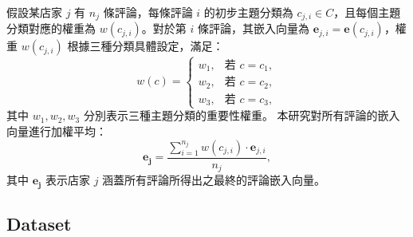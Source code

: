         假設某店家 \( j \) 有 \( n_j \) 條評論，每條評論 \( i \) 的初步主題分類為 \( c_{j,i} \in C \)，且每個主題分類對應的權重為 \( w(c_{j,i}) \)。對於第 \( i \) 條評論，其嵌入向量為 \( \mathbf{e}_{j,i} = \mathbf{e}(c_{j,i}) \)，權重 \( w(c_{j,i}) \) 根據三種分類具體設定，滿足：
        \begin{equation} 
            w(c) = 
            \begin{cases} 
                w_{1}, & \text{若 } c = c_1, \\ 
                w_{2}, & \text{若 } c = c_2, \\
                w_{3}, & \text{若 } c = c_3, 
            \end{cases} 
            \label{eq-weight} 
        \end{equation}
        其中 \( w_1, w_2, w_3 \) 分別表示三種主題分類的重要性權重。
        本研究對所有評論的嵌入向量進行加權平均：
        \begin{equation} 
            \mathbf{e_j} = \frac{\sum_{i=1}^{n_j} w(c_{j,i}) \cdot \mathbf{e}_{j,i}}{n_j},
            \label{eq-embedding} 
        \end{equation}
        其中 \( \mathbf{e_j} \) 表示店家 \( j \) 涵蓋所有評論所得出之最終的評論嵌入向量。
    \subsection{Dataset}

        
\color{black}